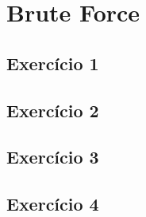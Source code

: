 \section{Brute Force}\label{sec:brute_force}

\subsection{Exercício 1}\label{sec:exer1}

\subsection{Exercício 2}\label{sec:exer2}

\subsection{Exercício 3}\label{sec:exer3}

\subsection{Exercício 4}\label{sec:exer4}
